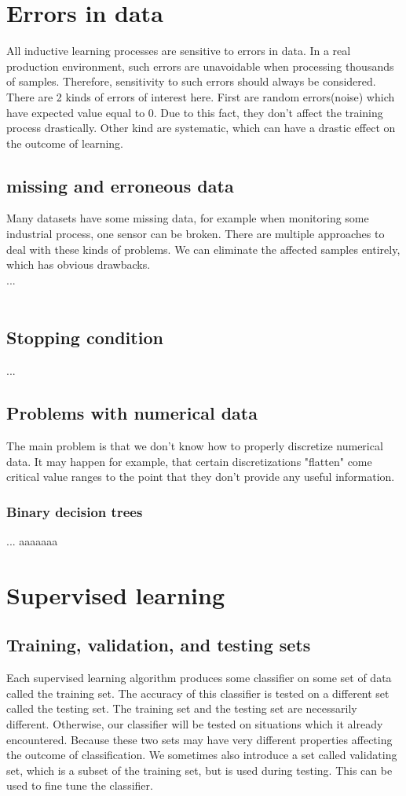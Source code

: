 
\chapter{Errors in data}
All inductive learning processes are sensitive to errors in data. In a real production environment, such errors
are unavoidable when processing thousands of samples. Therefore, sensitivity to such errors should always be considered.
There are 2 kinds of errors of interest here.
First are random errors(noise) which have expected value equal to 0. Due to this fact, they don't affect the training process
drastically.
Other kind are systematic, which can have a drastic effect on the outcome of learning.
\section{missing and erroneous data}
Many datasets have some missing data, for example when monitoring some industrial process, one sensor can be broken.
There are multiple approaches to deal with these kinds of problems.
We can eliminate the affected samples entirely, which has obvious drawbacks.\\
...\\
\\
\section{Stopping condition}
...
\section{Problems with numerical data}
The main problem is that we don't know how to properly discretize numerical data. It may happen for example,
that certain discretizations "flatten" come critical value ranges to the point that they don't provide any
useful information.
\subsection{Binary decision trees}
...
aaaaaaa
\chapter{Supervised learning}
\section{Training, validation, and testing sets}
Each supervised learning algorithm produces some classifier on some set of data called the training set.
The accuracy of this classifier is tested on a different set called the testing set. 
\nt
{
    The training set and the testing set are necessarily different.  Otherwise, our classifier will be tested
    on situations which it already encountered.
}
Because these two sets may have very different properties affecting the outcome of classification. We sometimes also introduce a set
called validating set, which is a subset of the training set, but is used during testing. This can be used to fine tune the classifier.

